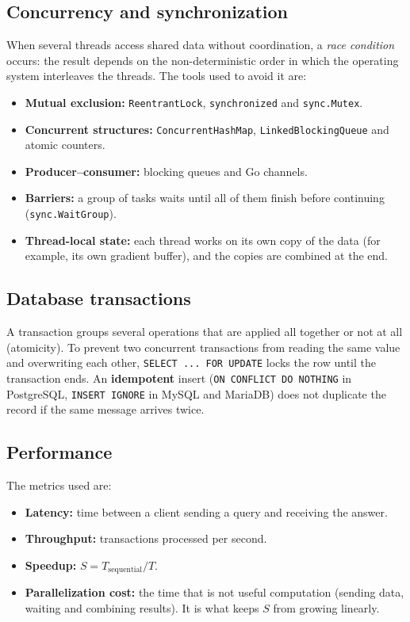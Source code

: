 \documentclass[10pt,a4paper]{article}
\begin{document}
\subsection{Concurrency and synchronization}

When several threads access shared data without coordination, a \textit{race condition} occurs: the
result depends on the non-deterministic order in which the operating system interleaves the threads.
The tools used to avoid it are:
\begin{itemize}
    \item \textbf{Mutual exclusion:} \texttt{ReentrantLock}, \texttt{synchronized} and \texttt{sync.Mutex}.
    \item \textbf{Concurrent structures:} \texttt{ConcurrentHashMap}, \texttt{LinkedBlockingQueue} and
    atomic counters.
    \item \textbf{Producer--consumer:} blocking queues and Go channels.
    \item \textbf{Barriers:} a group of tasks waits until all of them finish before continuing
    (\texttt{sync.WaitGroup}).
    \item \textbf{Thread-local state:} each thread works on its own copy of the data (for example,
    its own gradient buffer), and the copies are combined at the end.
\end{itemize}

\subsection{Database transactions}

A transaction groups several operations that are applied all together or not at all (atomicity). To
prevent two concurrent transactions from reading the same value and overwriting each other,
\texttt{SELECT ... FOR UPDATE} locks the row until the transaction ends. An \textbf{idempotent} insert
(\texttt{ON CONFLICT DO NOTHING} in PostgreSQL, \texttt{INSERT IGNORE} in MySQL and MariaDB) does not
duplicate the record if the same message arrives twice.

\subsection{Performance}

The metrics used are:
\begin{itemize}
    \item \textbf{Latency:} time between a client sending a query and receiving the answer.
    \item \textbf{Throughput:} transactions processed per second.
    \item \textbf{Speedup:} $S = T_{\text{sequential}} / T$.
    \item \textbf{Parallelization cost:} the time that is not useful computation (sending data,
    waiting and combining results). It is what keeps $S$ from growing linearly.
\end{itemize}
\end{document}
